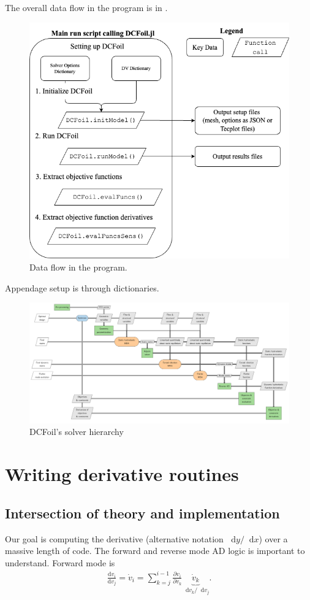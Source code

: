 \documentclass[10pt]{article}
\newcommand{\diff}{\mathop{}\!\tn{d}} %
\newcommand{\pp}[2]{\frac{\partial #1}{\partial #2}}
\newcommand{\dd}[2]{\frac{\textrm{d} #1}{\textrm{d} #2}}
\newcommand{\beq}{\begin{equation}\begin{aligned}}
\newcommand{\eeq}{\end{aligned}\end{equation}}
\newcommand{\tn}[1]{\textrm{#1}}
\begin{document}
The overall data flow in the program is in .
\begin{figure}[htb!]
	\centering
	\includegraphics[width=0.5\linewidth,clip,trim={0cm 0cm 0cm 0cm}]{dataFlow.png}
	\caption{\label{fig:DataFlow}Data flow in the program.}
\end{figure}
Appendage setup is through dictionaries.
\begin{landscape}
	
	\begin{figure}[htb!]
		\centering
		\includegraphics[width=\linewidth,clip,trim={0cm 0cm 0cm 0cm}]{dcfoil.pdf}
		\caption{\label{fig:XDSM}
		DCFoil's solver hierarchy
		}
	\end{figure}
\end{landscape}

\section{Writing derivative routines}
% 
\subsection{Intersection of theory and implementation}
Our goal is computing the derivative (alternative notation $\diff{y}/\diff{x}$) over a massive length of code.
The forward and reverse mode AD logic is important to understand.
Forward mode is
\beq
\dd{v_i}{v_j} = \dot{v}_i = \sum_{k=j}^{i-1}\pp{v_i}{v_k} \underbrace{\dot{v}_k}_{\diff{v_k}/\diff{v_j}}
.
\eeq
\end{document}
